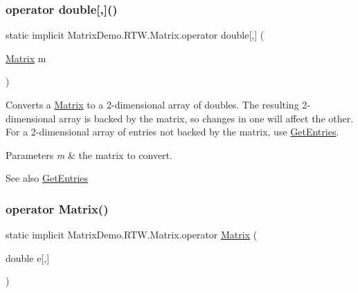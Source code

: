 \subsubsection{\texorpdfstring{operator double[,]()}{operator double[,]()}}
{\footnotesize\ttfamily static implicit Matrix\+Demo.\+R\+T\+W.\+Matrix.\+operator double\mbox{[},\mbox{]} (\begin{DoxyParamCaption}\item[{\mbox{\hyperlink{class_matrix_demo_1_1_r_t_w_1_1_matrix}{Matrix}}}]{m }\end{DoxyParamCaption})\hspace{0.3cm}{\ttfamily [static]}}



Converts a \mbox{\hyperlink{class_matrix_demo_1_1_r_t_w_1_1_matrix}{Matrix}} to a 2-\/dimensional array of doubles. The resulting 2-\/dimensional array is backed by the matrix, so changes in one will affect the other. For a 2-\/dimensional array of entries not backed by the matrix, use \mbox{\hyperlink{class_matrix_demo_1_1_r_t_w_1_1_matrix_a9f6f8e0e7acfbdd55852f258daf68b8f}{Get\+Entries}}. 


\begin{DoxyParams}{Parameters}
{\em m} & the matrix to convert.\\
\hline
\end{DoxyParams}
\begin{DoxySeeAlso}{See also}
\mbox{\hyperlink{class_matrix_demo_1_1_r_t_w_1_1_matrix_a9f6f8e0e7acfbdd55852f258daf68b8f}{Get\+Entries}}


\end{DoxySeeAlso}
\mbox{\label{class_matrix_demo_1_1_r_t_w_1_1_matrix_a0c737f7e6b54edac4d26b4f1c595ee92}} 
\subsubsection{\texorpdfstring{operator Matrix()}{operator Matrix()}}
{\footnotesize\ttfamily static implicit Matrix\+Demo.\+R\+T\+W.\+Matrix.\+operator \mbox{\hyperlink{class_matrix_demo_1_1_r_t_w_1_1_matrix}{Matrix}} (\begin{DoxyParamCaption}\item[{double}]{e\mbox{[},\mbox{]} }\end{DoxyParamCaption})\hspace{0.3cm}{\ttfamily [static]}}



